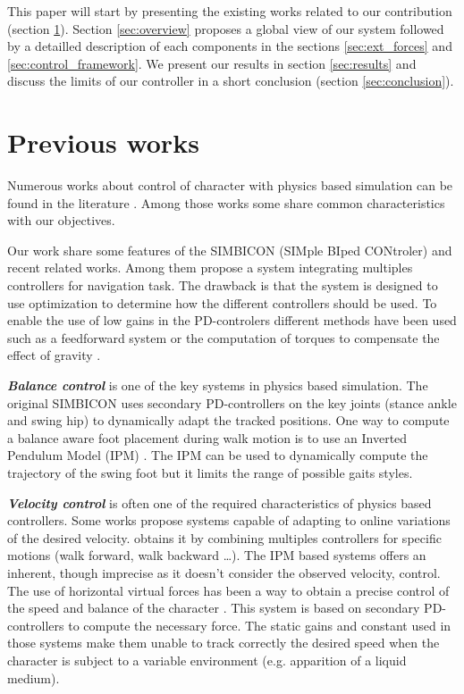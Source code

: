 \documentclass[conference]{acmsiggraph}
\begin{document}
This paper will start by presenting the existing works related to our contribution (section  \ref{sec:previous_works}). Section \ref{sec:overview} proposes a global view of our system followed by a detailled description of each components in the sections \ref{sec:ext_forces} and \ref{sec:control_framework}. We present our results in section \ref{sec:results} and discuss the limits of our controller in a short conclusion (section \ref{sec:conclusion}).
 
\section{Previous works}
\label{sec:previous_works}

Numerous works about control of character with physics based simulation can be found in the literature \cite{geijtenbeek2012interactive}. Among those works some share common characteristics with our objectives.

Our work share some features of the SIMBICON (SIMple BIped CONtroler) \cite{yin2007simbicon} and recent related works. Among them \cite{coros2009robust} propose a system integrating multiples controllers for navigation task. The drawback is that the system is designed to use optimization to determine how the different controllers should be used. To enable the use of low gains in the PD-controlers different methods have been used such as a feedforward system\cite{yin2007simbicon} or the computation of torques to compensate the effect of gravity \cite{coros2010generalized}.

\textbf{\textit{Balance control}} is one of the key systems in physics based simulation. The original SIMBICON uses secondary PD-controllers on the key joints (stance ankle and swing hip) to dynamically adapt the tracked positions. One way to compute a balance aware foot placement during walk motion is to use an Inverted Pendulum Model (IPM) \cite{coros2010generalized,kajita20013d}. The IPM can be used to dynamically compute the trajectory of the swing foot but it limits the range of possible gaits styles.

\textbf{\textit{Velocity control}} is often one of the required characteristics of physics based controllers.  Some works propose systems capable of adapting to online variations of the desired velocity. \cite{coros2009robust} obtains it by combining multiples controllers for specific motions (walk forward, walk backward …). The IPM based systems offers an inherent, though imprecise as it doesn't consider the observed velocity, control\cite{coros2010generalized}. The use of horizontal virtual forces has been a way to obtain a precise control of the speed and balance of the character \cite{coros2010generalized,geijtenbeek2012simple}. This system is based on secondary PD-controllers to compute the necessary force. The static gains and constant used in those systems make them unable to track correctly the desired speed when the character is subject to a variable environment (e.g. apparition of a liquid medium). 
\end{document}
